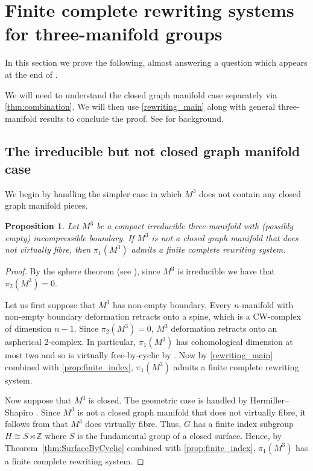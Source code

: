 \documentclass[12pt, a4paper]{amsart}
\newtheorem{proposition}[theorem]{Proposition}
\theoremstyle{definition}
\newcommand{\Z}{\mathbb{Z}}
\begin{document}
\section{Finite complete rewriting systems for three-manifold groups}
\label{sec:3man}

In this section we prove the following, almost answering a question which appears at the end of \cite{Hermiller1999}.

\MainTheoremC*

We will need to understand the closed graph manifold case separately via \cref{thm:combination}. We will then use \cref{rewriting_main} along with general three-manifold results to conclude the proof. See \cite{AFW15} for background.


\subsection{The irreducible but not closed graph manifold case}

We begin by handling the simpler case in which $M^3$ does not contain any closed graph manifold pieces.

\begin{proposition}
\label{prop:irreducible}
Let $M^3$ be a compact irreducible three-manifold with (possibly empty) incompressible boundary. If $M^3$ is not a closed graph manifold that does not virtually fibre, then $\pi_1(M^3)$ admits a finite complete rewriting system.
\end{proposition}

\begin{proof}
By the sphere theorem (see \cite[Theorem 1.3.2]{AFW15}), since $M^3$ is irreducible we have that $\pi_2(M^3) = 0$. 

Let us first suppose that $M^3$ has non-empty boundary. Every $n$-manifold with non-empty boundary deformation retracts onto a spine, which is a CW-complex of dimension $n-1$. Since $\pi_2(M^3) = 0$, $M^3$ deformation retracts onto an aspherical 2-complex. In particular, $\pi_1(M^3)$ has cohomological dimension at most two and so is virtually free-by-cyclic by \cite{KL24b}. Now by \cref{rewriting_main} combined with \cref{prop:finite_index}, $\pi_1(M^3)$ admits a finite complete rewriting system.

Now suppose that $M^3$ is closed. The geometric case is handled by Hermiller--Shapiro \cite{Hermiller1999}. Since $M^3$ is not a closed graph manifold that does not virtually fibre, it follows from \cite{WY97,Ag13,PW18} that $M^3$ does virtually fibre. Thus, $G$ has a finite index subgroup $H \cong S\rtimes\Z$ where $S$ is the fundamental group of a closed surface. Hence, by Theorem~\ref{thm:SurfaceByCyclic} combined with \cref{prop:finite_index}, $\pi_1(M^3)$ has a finite complete rewriting system.
\end{proof}
\end{document}
